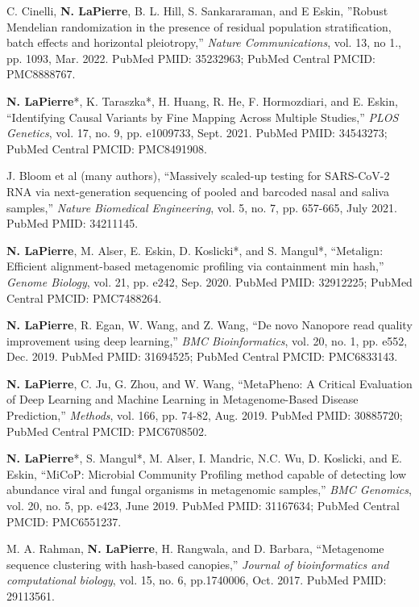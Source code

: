 \documentclass[margin, 10pt]{res} %
\begin{document}
\begin{resume}
C. Cinelli, \textbf{N. LaPierre}, B. L. Hill, S. Sankararaman, and E Eskin, ''Robust Mendelian randomization in the presence of residual population stratification, batch effects and horizontal pleiotropy,'' \emph{Nature Communications}, vol. 13, no 1., pp. 1093, Mar. 2022.  PubMed PMID: 35232963; PubMed Central PMCID: PMC8888767.

\textbf{N. LaPierre}*, K. Taraszka*, H. Huang, R. He, F. Hormozdiari, and E. Eskin, ``Identifying Causal Variants by Fine Mapping Across Multiple Studies,'' \emph{PLOS Genetics}, vol. 17, no. 9, pp. e1009733, Sept. 2021.  PubMed PMID: 34543273; PubMed Central PMCID: PMC8491908.

J. Bloom et al (many authors), ``Massively scaled-up testing for SARS-CoV-2 RNA via next-generation sequencing of pooled and barcoded nasal and saliva samples,'' \emph{Nature Biomedical Engineering}, vol. 5, no. 7, pp. 657-665, July 2021.  PubMed PMID: 34211145.

\textbf{N. LaPierre}, M. Alser, E. Eskin, D. Koslicki*, and S. Mangul*, ``Metalign: Efficient alignment-based metagenomic profiling via containment min hash,'' \emph{Genome Biology}, vol. 21, pp. e242, Sep. 2020. PubMed PMID: 32912225; PubMed Central PMCID: PMC7488264.


\textbf{N. LaPierre}, R. Egan, W. Wang, and Z. Wang, ``De novo Nanopore read quality improvement using deep learning,'' \emph{BMC Bioinformatics}, vol. 20, no. 1, pp. e552, Dec. 2019. PubMed PMID: 31694525; PubMed Central PMCID: PMC6833143.

\textbf{N. LaPierre}, C. Ju, G. Zhou, and W. Wang, ``MetaPheno: A Critical Evaluation of Deep Learning and Machine Learning in Metagenome-Based Disease Prediction,'' \emph{Methods}, vol. 166, pp. 74-82, Aug. 2019. PubMed PMID: 30885720; PubMed Central PMCID: PMC6708502.

\textbf{N. LaPierre}*, S. Mangul*, M. Alser, I. Mandric, N.C. Wu, D. Koslicki, and E. Eskin, ``MiCoP: Microbial Community Profiling method capable of detecting low abundance viral and fungal organisms in metagenomic samples,'' \emph{BMC Genomics}, vol. 20, no. 5, pp. e423, June 2019. PubMed PMID: 31167634; PubMed Central PMCID: PMC6551237.

M. A. Rahman, \textbf{N. LaPierre}, H. Rangwala, and D. Barbara, ``Metagenome sequence clustering with hash-based canopies,'' \emph{Journal of bioinformatics and computational biology}, vol. 15, no. 6, pp.1740006, Oct. 2017. PubMed PMID: 29113561.


\end{resume}
\end{document}
